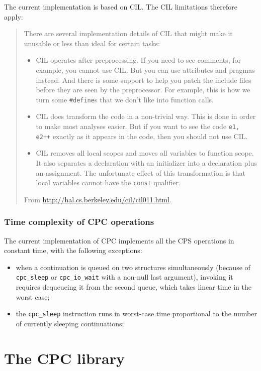 \documentclass[a4paper]{report}
\begin{document}
The current implementation is based on CIL.  The CIL limitations
therefore apply:
\begin{quote}
There are several implementation details of CIL that might make it
unusable or less than ideal for certain tasks:
\begin{itemize}
\item CIL operates after preprocessing. If you need to see comments, for
example, you cannot use CIL. But you can use attributes and pragmas
instead. And there is some support to help you patch the include
files before they are seen by the preprocessor. For example, this is
how we turn some {\tt \#define}s that we don’t like into function calls.
\item CIL does transform the code in a non-trivial way. This is done
in order to make most analyses easier. But if you want to see
the code {\tt e1, e2++} exactly as it appears in the code, then you
should not use CIL.
\item CIL removes all local scopes and moves all variables to
function scope. It also separates a declaration with an
initializer into a declaration plus an assignment. The
unfortunate effect of this transformation is that local
variables cannot have the {\tt const} qualifier.
\end{itemize}
From \url{http://hal.cs.berkeley.edu/cil/cil011.html}.
\end{quote}

\subsection{Time complexity of CPC operations}

The current implementation of CPC implements all the CPS operations in
constant time, with the following exceptions:
\begin{itemize} 
\item when a continuation is queued on two structures simultaneously
  (because of {\tt cpc\_sleep} or {\tt cpc\_io\_wait} with a non-null
  last argument), invoking it requires dequeueing it from the second
  queue, which takes linear time in the worst case;
\item the {\tt cpc\_sleep} instruction runs in worst-case time
  proportional to the number of currently sleeping continuations;
\end{itemize}

\chapter{The CPC library}
\end{document}
